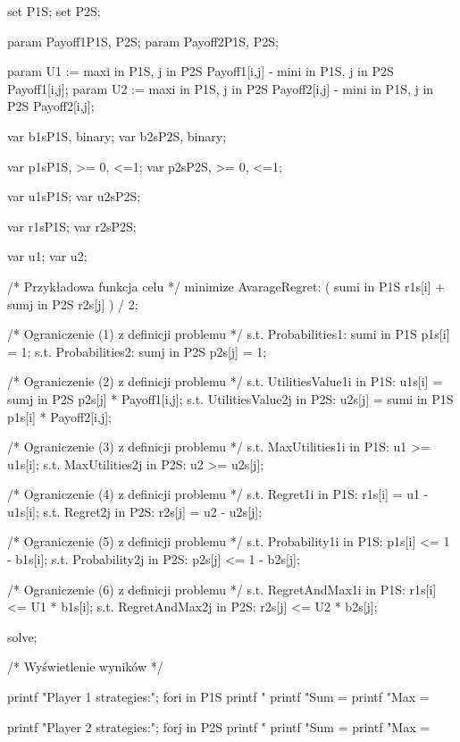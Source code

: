 \documentclass[polish]{standalone}
\begin{document}
\begin{mathprog}[caption=Szukanie rozwiązania]
set P1S;
set P2S;

param Payoff1{P1S, P2S};
param Payoff2{P1S, P2S};

param U1 := max{i in P1S, j in P2S}
  Payoff1[i,j] - min{i in P1S, j in P2S} Payoff1[i,j];
param U2 := max{i in P1S, j in P2S}
  Payoff2[i,j] - min{i in P1S, j in P2S} Payoff2[i,j];

var b1s{P1S}, binary;
var b2s{P2S}, binary;

var p1s{P1S}, >= 0, <=1;
var p2s{P2S}, >= 0, <=1;

var u1s{P1S};
var u2s{P2S};

var r1s{P1S};
var r2s{P2S};

var u1;
var u2;

/* Przykładowa funkcja celu */
minimize AvarageRegret:
  ( sum{i in P1S} r1s[i] + sum{j in P2S} r2s[j] ) / 2;

/* Ograniczenie (1) z definicji problemu */
s.t. Probabilities1:
	sum{i in P1S} p1s[i] = 1;
s.t. Probabilities2:
	sum{j in P2S} p2s[j] = 1;

/* Ograniczenie (2) z definicji problemu */
s.t. UtilitiesValue1{i in P1S}:
	u1s[i] = sum{j in P2S} p2s[j] * Payoff1[i,j];
s.t. UtilitiesValue2{j in P2S}:
	u2s[j] = sum{i in P1S} p1s[i] * Payoff2[i,j];

/* Ograniczenie (3) z definicji problemu */
s.t. MaxUtilities1{i in P1S}:
	u1 >= u1s[i];
s.t. MaxUtilities2{j in P2S}:
	u2 >= u2s[j];

/* Ograniczenie (4) z definicji problemu */
s.t. Regret1{i in P1S}:
	r1s[i] = u1 - u1s[i];
s.t. Regret2{j in P2S}:
	r2s[j] = u2 - u2s[j];

/* Ograniczenie (5) z definicji problemu */
s.t. Probability1{i in P1S}:
	p1s[i] <= 1 - b1s[i];
s.t. Probability2{j in P2S}:
	p2s[j] <= 1 - b2s[j];

/* Ograniczenie (6) z definicji problemu */
s.t. RegretAndMax1{i in P1S}:
	r1s[i] <= U1 * b1s[i];
s.t. RegretAndMax2{j in P2S}:
	r2s[j] <= U2 * b2s[j];

solve;
 
/* Wyświetlenie wyników */ 

printf "Player 1 strategies:\n";
for{i in P1S}
	printf "%
printf "Sum = %
printf "Max = %
 
printf "Player 2 strategies:\n";
for{j in P2S}
	printf "%
printf "Sum = %
printf "Max = %
\end{mathprog}
\end{document}
